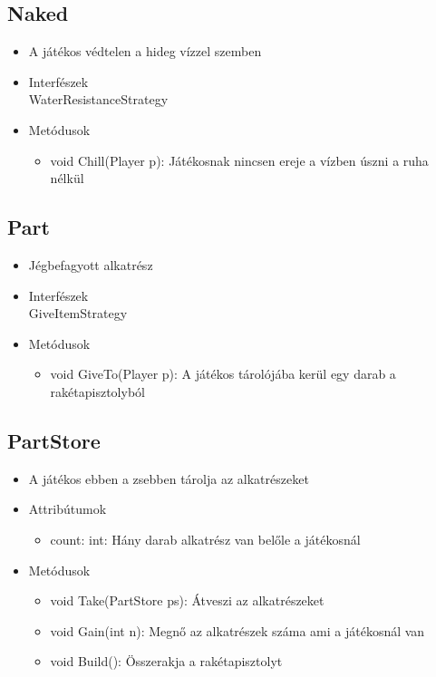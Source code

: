 \subsection{Naked}
\begin{itemize}
	\item A játékos védtelen a hideg vízzel szemben\\
	
\item Interfészek\\
WaterResistanceStrategy
\item Metódusok
\begin{itemize}
	\item void Chill(Player p): Játékosnak nincsen ereje a vízben úszni a ruha nélkül
\end{itemize}
\end{itemize}

\subsection{Part}
\begin{itemize}
	\item Jégbefagyott alkatrész\\

\item Interfészek\\
GiveItemStrategy

\item Metódusok\\
\begin{itemize}
	\item void GiveTo(Player p): A játékos tárolójába kerül egy darab a rakétapisztolyból
\end{itemize}
\end{itemize}

\subsection{PartStore}
\begin{itemize}
	\item A játékos ebben a zsebben tárolja az alkatrészeket\\
	
\item Attribútumok\\
\begin{itemize}
	\item count: int: Hány darab alkatrész van belőle a játékosnál
\end{itemize}
\item Metódusok\\
\begin{itemize}
	\item void Take(PartStore ps): Átveszi az alkatrészeket
	\item void Gain(int n): Megnő az alkatrészek száma ami a játékosnál van
	\item void Build(): Összerakja a rakétapisztolyt
\end{itemize}
\end{itemize}

